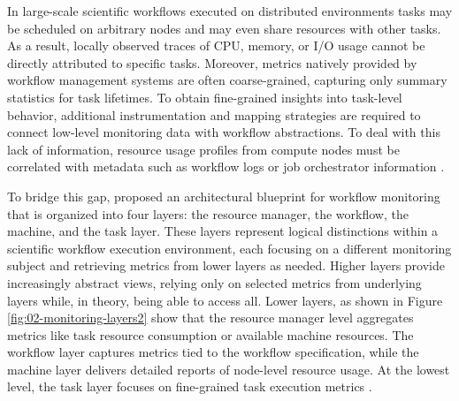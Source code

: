 In large-scale scientific workflows executed on distributed environments tasks may be scheduled on arbitrary nodes and may even share resources with other tasks. As a result, locally observed traces of CPU, memory, or I/O usage cannot be directly attributed to specific tasks.  Moreover, metrics natively provided by workflow management systems are often coarse-grained, capturing only summary statistics for task lifetimes. To obtain fine-grained insights into task-level behavior, additional instrumentation and mapping strategies are required to connect low-level monitoring data with workflow abstractions. To deal with this lack of information, resource usage profiles from compute nodes must be correlated with metadata such as workflow logs or job orchestrator information \cite{Witzke2024} \cite{Bader_2022}.

To bridge this gap, \cite{Bader_2022} proposed an architectural blueprint for workflow monitoring that is organized into four layers: the resource manager, the workflow, the machine, and the task layer. These layers represent logical distinctions within a scientific workflow execution environment, each focusing on a different monitoring subject and retrieving metrics from lower layers as needed. Higher layers provide increasingly abstract views, relying only on selected metrics from underlying layers while, in theory, being able to access all. Lower layers, as shown in Figure \ref{fig:02-monitoring-layers2} show that the resource manager level aggregates metrics like task resource consumption or available machine resources. The workflow layer captures metrics tied to the workflow specification, while the machine layer delivers detailed reports of node-level resource usage. At the lowest level, the task layer focuses on fine-grained task execution metrics \cite{Bader_2022}.

